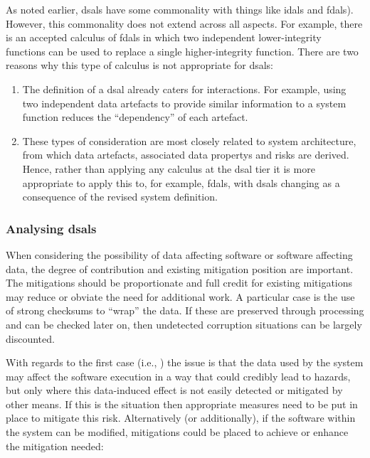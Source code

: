 As noted earlier, \glspl{dsal} have some commonality with things like \cbstart\glspl{idal} and \glspl{fdal})\cbend. However, this commonality does not extend across all aspects. For example, there is an accepted calculus of \glspl{fdal} in which two independent lower-\gls{integrity} functions can be used to replace a single higher-\gls{integrity} function. There are two reasons why this type of calculus is not appropriate for \glspl{dsal}:

\begin{enumerate}
  \item The definition of a \gls{dsal} already caters for interactions. For example, using two independent \glspl{data artefact} to provide similar \gls{information} to a system function reduces the ``dependency'' of each artefact.
  \item These types of consideration are most closely related to system architecture, from which \glspl{data artefact}, associated \glspl{data property} and risks are derived. Hence, rather than applying any calculus at the \gls{dsal} tier it is more appropriate to apply this to, for example, \glspl{fdal}, with \glspl{dsal} changing as a consequence of the revised system definition.
\end{enumerate}

\subsubsection{Analysing \glspl{dsal}}
When considering the possibility of data affecting software or software affecting data, the degree of contribution and existing mitigation position are important. The mitigations should be proportionate and full credit for existing mitigations may reduce or obviate the need for additional work. A particular case is the use of strong checksums to ``wrap'' the data. If these are preserved through processing and can be checked later on, then undetected  corruption situations can be largely discounted.

With regards to the first case (i.e., ) the issue is that the data used by the system may affect the software execution in a way that could credibly lead to \glspl{hazard}, but only where this data-induced effect is not easily detected or mitigated by other means. If this is the situation then appropriate measures need to be put in place  to mitigate this risk. Alternatively (or additionally), if the software within the system can be modified, mitigations could be placed  to achieve or enhance the mitigation needed:


